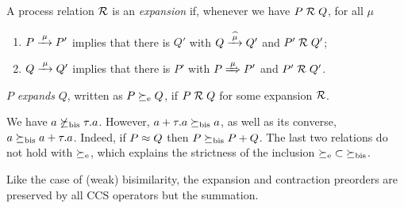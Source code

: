 
\begin{definition}%
\label{d:expa}
A process relation ${{\cal R}}$
  is an \emph{expansion} if, whenever
we have $P\mathrel{\cal R} Q$, for all $\mu$
 \begin{enumerate}
 \item   $P \arr\mu P'$ implies that there is $Q'$ with $Q \arcap \mu
   Q'$
  and $P' \mathrel{\cal R} Q'$;
 \item
     $Q \arr\mu Q'$   implies that there is $P'$ with $P \Arr \mu
  P'$ and $P'
 \mathrel{\cal R} Q'$.
 \end{enumerate}
  $P$  {\em expands} $Q$, written as
 $P  \mathrel{\succeq_{\rm{e}}} Q$,
 if $P \mathrel{\cal R} Q$ for some expansion ${\cal R}$.
 \end{definition}

\begin{example}
\label{exa:contr}
We have %
 $ a \not  \mathrel{\succeq_{\rm{bis}}} \tau. a$. However,
$a+ \tau . a \mathrel{\succeq_{\rm{bis}}} a$, as well as its converse, 
$  a \mathrel{\succeq_{\rm{bis}}} a +
\tau . a $. Indeed, if $P \approx Q$ then 
$  P  \mathrel{\succeq_{\rm{bis}}} P +Q$. The last two relations do not hold with 
$\mathrel{\succeq_{\rm{e}}}$, which explains the strictness of the inclusion
 ${\mathrel{\succeq_{\rm{e}}}} \subset {\mathrel{\succeq_{\rm{bis}}}}$. 
\end{example} 


Like the case of (weak) bisimilarity, the expansion and contraction
preorders are preserved by all CCS operators but the summation.
